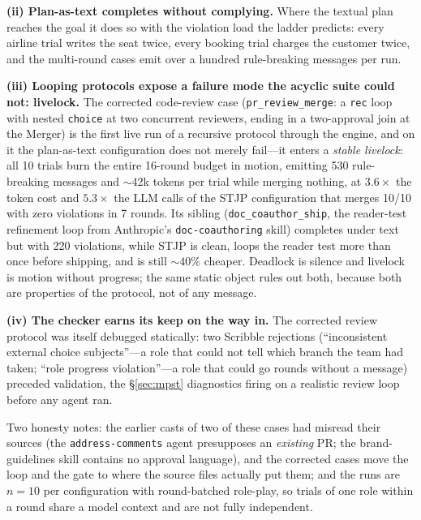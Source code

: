 \documentclass{article}
\newcommand{\stjp}{\textsc{STJP}}
\begin{document}
\textbf{(ii) Plan-as-text completes without complying.} Where the textual plan reaches the goal it does so with the violation load the ladder predicts: every airline trial writes the seat twice, every booking trial charges the customer twice, and the multi-round cases emit over a hundred rule-breaking messages per run.

\textbf{(iii) Looping protocols expose a failure mode the acyclic suite could not: livelock.} The corrected code-review case (\texttt{pr\_review\_merge}: a \texttt{rec} loop with nested \texttt{choice} at two concurrent reviewers, ending in a two-approval join at the Merger) is the first live run of a recursive protocol through the engine, and on it the plan-as-text configuration does not merely fail---it enters a \emph{stable livelock}: all 10 trials burn the entire 16-round budget in motion, emitting 530 rule-breaking messages and $\sim$42k tokens per trial while merging nothing, at $3.6\times$ the token cost and $5.3\times$ the LLM calls of the \stjp{} configuration that merges 10/10 with zero violations in 7 rounds. Its sibling (\texttt{doc\_coauthor\_ship}, the reader-test refinement loop from Anthropic's \texttt{doc-coauthoring} skill) completes under text but with 220 violations, while \stjp{} is clean, loops the reader test more than once before shipping, and is still ${\sim}40\%$ cheaper. Deadlock is silence and livelock is motion without progress; the same static object rules out both, because both are properties of the protocol, not of any message.

\textbf{(iv) The checker earns its keep on the way in.} The corrected review protocol was itself debugged statically: two Scribble rejections (``inconsistent external choice subjects''---a role that could not tell which branch the team had taken; ``role progress violation''---a role that could go rounds without a message) preceded validation, the \S\ref{sec:mpst} diagnostics firing on a realistic review loop before any agent ran.

Two honesty notes: the earlier casts of two of these cases had misread their sources (the \texttt{address-comments} agent presupposes an \emph{existing} PR; the brand-guidelines skill contains no approval language), and the corrected cases move the loop and the gate to where the source files actually put them; and the runs are $n{=}10$ per configuration with round-batched role-play, so trials of one role within a round share a model context and are not fully independent.
\end{document}
